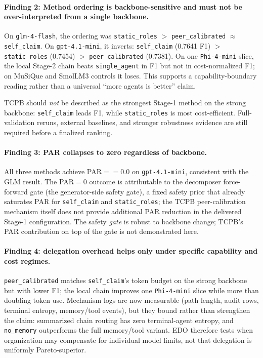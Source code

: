 \documentclass[11pt]{article}
\begin{document}
\paragraph{Finding 2: Method ordering is backbone-sensitive and must not be over-interpreted from a single backbone.} On \texttt{glm-4-flash}, the ordering was \texttt{static\_roles} $>$ \texttt{peer\_calibrated} $\approx$ \texttt{self\_claim}. On \texttt{gpt-4.1-mini}, it inverts: \texttt{self\_claim} (0.7641 F1) $>$ \texttt{static\_roles} (0.7454) $>$ \texttt{peer\_calibrated} (0.7381). On one \texttt{Phi-4-mini} slice, the local Stage-2 chain beats \texttt{single\_agent} in F1 but not in cost-normalized F1; on MuSiQue and SmolLM3 controls it loses. This supports a capability-boundary reading rather than a universal ``more agents is better'' claim.

TCPB should \emph{not} be described as the strongest Stage-1 method on the strong backbone: \texttt{self\_claim} leads F1, while \texttt{static\_roles} is most cost-efficient. Full-validation reruns, external baselines, and stronger robustness evidence are still required before a finalized ranking.

\paragraph{Finding 3: PAR collapses to zero regardless of backbone.} All three methods achieve PAR$={=}0.0$ on \texttt{gpt-4.1-mini}, consistent with the GLM result. The PAR$=0$ outcome is attributable to the decomposer force-forward gate (the generator-side safety gate), a fixed safety prior that already saturates PAR for \texttt{self\_claim} and \texttt{static\_roles}; the TCPB peer-calibration mechanism itself does not provide additional PAR reduction in the delivered Stage-1 configuration. The safety \emph{gate} is robust to backbone change; TCPB's PAR contribution on top of the gate is not demonstrated here.

\paragraph{Finding 4: delegation overhead helps only under specific capability and cost regimes.} \texttt{peer\_calibrated} matches \texttt{self\_claim}'s token budget on the strong backbone but with lower F1; the local chain improves one \texttt{Phi-4-mini} slice while more than doubling token use. Mechanism logs are now measurable (path length, audit rows, terminal entropy, memory/tool events), but they bound rather than strengthen the claim: summarized chain routing has zero terminal-agent entropy, and \texttt{no\_memory} outperforms the full memory/tool variant. EDO therefore tests when organization may compensate for individual model limits, not that delegation is uniformly Pareto-superior.
\end{document}
